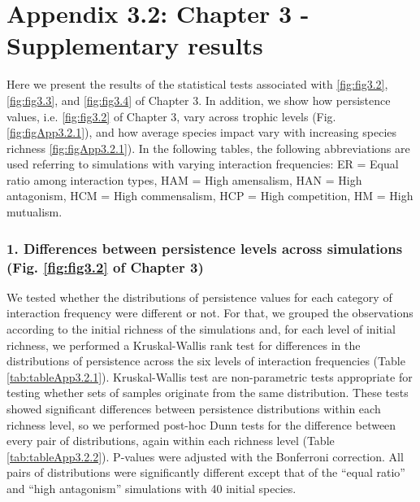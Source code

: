 \chapter[Appendix 3.2: Chapter 3 - Supplementary results]{Appendix 3.2: Chapter 3 - Supplementary results}\label{ch:Appendix3.2}
\renewcommand{\thefigure}{A.3.2.\arabic{figure}}
\setcounter{figure}{0}

\renewcommand{\thetable}{A.3.2.\arabic{table}}
\setcounter{table}{0}

Here we present the results of the statistical tests associated with \cref{fig:fig3.2},\cref{fig:fig3.3}, and \cref{fig:fig3.4} of Chapter 3. In addition, we show how persistence values, i.e. \cref{fig:fig3.2} of Chapter 3, vary across trophic levels (Fig. \ref{fig:figApp3.2.1}), and how average species impact vary with increasing species richness \ref{fig:figApp3.2.1}). In the following tables, the following abbreviations are used referring to simulations with varying interaction frequencies: ER = Equal ratio among interaction types, HAM = High amensalism, HAN = High antagonism, HCM = High commensalism, HCP = High competition, HM = High mutualism.

\subsection*{1. Differences between persistence levels across simulations (Fig. \cref{fig:fig3.2} of Chapter 3)}\label{persistence-differences}

We tested whether the distributions of persistence values for each category of interaction frequency were different or not. For that, we grouped the observations according to the initial richness of the simulations and, for each level of initial richness, we performed a Kruskal-Wallis rank test for differences in the distributions of persistence across the six levels of interaction frequencies (Table \ref{tab:tableApp3.2.1}). Kruskal-Wallis test are non-parametric tests appropriate for testing whether sets of samples originate from the same distribution. These tests showed significant differences between persistence distributions within each richness level, so we performed post-hoc Dunn tests for the difference between every pair of distributions, again within each richness level (Table \ref{tab:tableApp3.2.2}). P-values were adjusted with the Bonferroni correction. All pairs of distributions were significantly different except that of the ``equal ratio'' and ``high antagonism'' simulations with 40 initial species.

